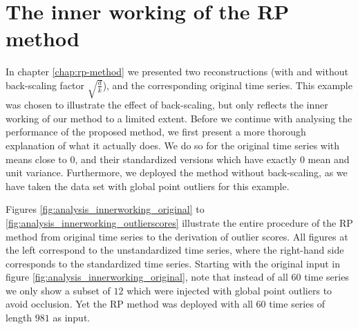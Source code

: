 \section{The inner working of the RP method}
\label{sec:analysis_innerworking}

In chapter \ref{chap:rp-method} we presented two reconstructions (with and without back-scaling factor $\sqrt{\frac{d}{k}}$), and the corresponding original time series. This example was chosen to illustrate the effect of back-scaling, but only reflects the inner working of our method to a limited extent. Before we continue with analysing the performance of the proposed method, we first present a more thorough explanation of what it actually does.
We do so for the original time series with means close to $0$, and their standardized versions which have exactly $0$ mean and unit variance. Furthermore, we deployed the method without back-scaling, as we have taken the data set with global point outliers for this example.

Figures \ref{fig:analysis_innerworking_original} to \ref{fig:analysis_innerworking_outlierscores} illustrate the entire procedure of the RP method from original time series to the derivation of outlier scores. All figures at the left correspond to the unstandardized time series, where the right-hand side corresponds to the standardized time series. Starting with the original input in figure \ref{fig:analysis_innerworking_original}, note that instead of all $60$ time series we only show a subset of $12$ which were injected with global point outliers to avoid occlusion. Yet the RP method was deployed with all $60$ time series of length $981$ as input.
 
